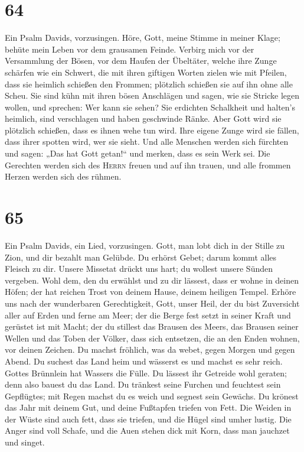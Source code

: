 \hypertarget{section-63}{%
\section{64}\label{section-63}}

 Ein Psalm Davids, vorzusingen.  Höre, Gott,
meine Stimme in meiner Klage; behüte mein Leben vor dem grausamen
Feinde.  Verbirg mich vor der Versammlung der Bösen, vor
dem Haufen der Übeltäter,  welche ihre Zunge schärfen wie
ein Schwert, die mit ihren giftigen Worten zielen wie mit Pfeilen,
 dass sie heimlich schießen den Frommen; plötzlich
schießen sie auf ihn ohne alle Scheu.  Sie sind kühn mit
ihren bösen Anschlägen und sagen, wie sie Stricke legen wollen, und
sprechen: Wer kann sie sehen?  Sie erdichten Schalkheit
und halten's heimlich, sind verschlagen und haben geschwinde Ränke.
 Aber Gott wird sie plötzlich schießen, dass es ihnen wehe
tun wird.  Ihre eigene Zunge wird sie fällen, dass ihrer
spotten wird, wer sie sieht.  Und alle Menschen werden
sich fürchten und sagen: „Das hat Gott getan!{}`` und merken, dass es
sein Werk sei.  Die Gerechten werden sich des
\textsc{Herrn} freuen und auf ihn trauen, und alle frommen Herzen werden
sich des rühmen.

\hypertarget{section-64}{%
\section{65}\label{section-64}}

 Ein Psalm Davids, ein Lied, vorzusingen. 
Gott, man lobt dich in der Stille zu Zion, und dir bezahlt man Gelübde.
 Du erhörst Gebet; darum kommt alles Fleisch zu dir.
 Unsere Missetat drückt uns hart; du wollest unsere Sünden
vergeben.  Wohl dem, den du erwählst und zu dir lässest,
dass er wohne in deinen Höfen; der hat reichen Trost von deinem Hause,
deinem heiligen Tempel.  Erhöre uns nach der wunderbaren
Gerechtigkeit, Gott, unser Heil, der du bist Zuversicht aller auf Erden
und ferne am Meer;  der die Berge fest setzt in seiner
Kraft und gerüstet ist mit Macht;  der du stillest das
Brausen des Meers, das Brausen seiner Wellen und das Toben der Völker,
 dass sich entsetzen, die an den Enden wohnen, vor deinen
Zeichen. Du machst fröhlich, was da webet, gegen Morgen und gegen Abend.
 Du suchest das Land heim und wässerst es und machst es
sehr reich. Gottes Brünnlein hat Wassers die Fülle. Du lässest ihr
Getreide wohl geraten; denn also bauest du das Land.  Du
tränkest seine Furchen und feuchtest sein Gepflügtes; mit Regen machst
du es weich und segnest sein Gewächs.  Du krönest das
Jahr mit deinem Gut, und deine Fußtapfen triefen von Fett.
 Die Weiden in der Wüste sind auch fett, dass sie
triefen, und die Hügel sind umher lustig.  Die Anger sind
voll Schafe, und die Auen stehen dick mit Korn, dass man jauchzet und
singet.

